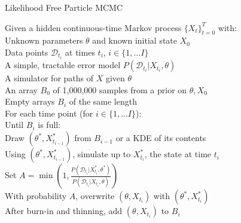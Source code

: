 \documentclass[12pt,a4paper,t,xcolor=dvipsnames,slidestop,compress,mathserif]{beamer}
\begin{document}
\begin{frame}{Likelihood Free Particle MCMC}

\begin{algorithm}[H]
Given a hidden continuous-time Markov process $\{X_t\}_{t=0}^T$ with: \\
\Indp \Indp
Unknown parameters $\theta$ and known initial state $X_0$\\
Data points $\mathcal{D}_{t_{i}}$ at times $t_{i}$, $i \in \{1, ... I\}$ \\
A simple, tractable error model $P(\mathcal{D}_{t_{i}}|X_{t_{i}}, \theta)$\\
A simulator for paths of $X$ given $\theta$\\
An array $B_0$ of 1,000,000 samples from a prior on $\theta, X_0$\\
Empty arrays $B_{i}$ of the same length\\

\Indm \Indm
For each time point (for $i \in \{1, ... I\}$):\\
\Indp\Indp
Until $B_{i}$ is full: \\
\Indp\Indp
Draw $(\theta^*, X_{t_{i-1}}^*)$ from $B_{i-1}$ or a KDE of its contents\\
Using $(\theta^*, X_{t_{i-1}}^*)$, simulate up to $X_{t_{i}}^*$, the state at time $t_{i}$ \\
Set $A=\min(1, \frac{P(\mathcal{D}_{t_{i}}|X_{t_{i}}^*, \theta^*)}{P(\mathcal{D}_{t_{i}}|X_{t_{i}}, \theta)})$\\
With probability $A$, overwrite $(\theta, X_{t_{i}})$ with $(\theta^*, X_{t_{i}}^*)$\\
After burn-in and thinning, add $(\theta, X_{t_{i}})$ to $B_{i}$\\

\end{algorithm}
\end{frame}
\end{document}
